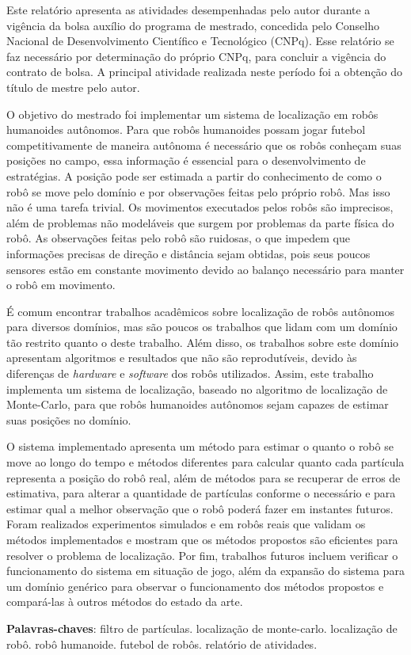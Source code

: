 \documentclass[
  12pt,       %
  oneside,
  a4paper,      %
  english,      %
  french,       %
  spanish,      %
  brazil,       %
  ]{abntex2}
\begin{document}
\setlength{\absparsep}{10pt} %
\begin{resumo}
  Este relatório apresenta as atividades desempenhadas pelo autor durante a vigência da bolsa auxílio do programa de mestrado, concedida pelo Conselho Nacional de Desenvolvimento Científico e Tecnológico (CNPq).
  Esse relatório se faz necessário por determinação do próprio CNPq, para concluir a vigência do contrato de bolsa.
  A principal atividade realizada neste período foi a obtenção do título de mestre pelo autor.

  O objetivo do mestrado foi implementar um sistema de localização em robôs humanoides autônomos.
  Para que robôs humanoides possam jogar futebol competitivamente de maneira autônoma é necessário que os robôs conheçam suas posições no campo, essa informação é essencial para o desenvolvimento de estratégias.
  A posição pode ser estimada a partir do conhecimento de como o robô se move pelo domínio e por observações feitas pelo próprio robô.
  Mas isso não é uma tarefa trivial.
  Os movimentos executados pelos robôs são imprecisos, além de problemas não modeláveis que surgem por problemas da parte física do robô.
  As observações feitas pelo robô são ruidosas, o que impedem que informações precisas de direção e distância sejam obtidas, pois seus poucos sensores estão em constante movimento devido ao balanço necessário para manter o robô em movimento.

  É comum encontrar trabalhos acadêmicos sobre localização de robôs autônomos para diversos domínios, mas são poucos os trabalhos que lidam com um domínio tão restrito quanto o deste trabalho.
  Além disso, os trabalhos sobre este domínio apresentam algoritmos e resultados que não são reprodutíveis, devido às diferenças de \textit{hardware} e \textit{software} dos robôs utilizados.
  Assim, este trabalho implementa um sistema de localização, baseado no algoritmo de localização de Monte-Carlo, para que robôs humanoides autônomos sejam capazes de estimar suas posições no domínio.
  
  O sistema implementado apresenta um método para estimar o quanto o robô se move ao longo do tempo e métodos diferentes para calcular quanto cada partícula representa a posição do robô real, além de métodos para se recuperar de erros de estimativa, para alterar a quantidade de partículas conforme o necessário e para estimar qual a melhor observação que o robô poderá fazer em instantes futuros.
  Foram realizados experimentos simulados e em robôs reais que validam os métodos implementados e mostram que os métodos propostos são eficientes para resolver o problema de localização.
  Por fim, trabalhos futuros incluem verificar o funcionamento do sistema em situação de jogo, além da expansão do sistema para um domínio genérico para observar o funcionamento dos métodos propostos e compará-las à outros métodos do estado da arte.

  \noindent
  \textbf{Palavras-chaves}: filtro de partículas. localização de monte-carlo. localização de robô. robô humanoide. futebol de robôs. relatório de atividades.
\end{resumo}
\end{document}
